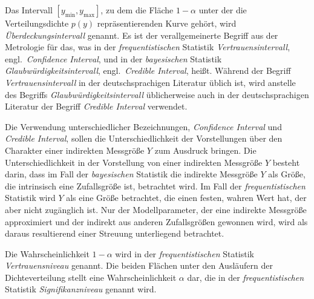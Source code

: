 Das Intervall $[y_\mathrm{min}, y_\mathrm{max}]$, zu dem die Fläche $1 - \alpha$ unter der die
Verteilungsdichte $p(y)$ repräsentierenden Kurve gehört, wird \textsl{Überdeckungsintervall} genannt.
Es ist der verallgemeinerte Begriff aus der Metrologie für das, was in der
\textsl{frequentistischen} Statistik \textsl{Vertrauensintervall},
engl.\  \textsl{Confidence Interval}, und in der \textsl{bayesischen} Statistik
\textsl{Glaubwürdigkeitsintervall}, engl.\ \textsl{Credible Interval},
heißt. Während der Begriff \textsl{Vertrauensintervall} in der deutschsprachigen
Literatur üblich ist, wird anstelle des Begriffs \textsl{Glaubwürdigkeitsintervall} üblicherweise
auch in der deutschsprachigen Literatur der Begriff \textsl{Credible Interval} verwendet.

Die Verwendung unterschiedlicher Bezeichnungen, \textsl{Confidence Interval} und
\textsl{Credible Interval}, sollen die Unterschiedlichkeit der Vorstellungen
über den Charakter einer indirekten Messgröße $Y$ zum Ausdruck bringen.
Die Unterschiedlichkeit in der Vorstellung von einer indirekten Messgröße $Y$ besteht darin,
dass im Fall der \textsl{bayesischen} Statistik
die indirekte Messgröße $Y$ als Größe, die intrinsisch eine Zufallsgröße ist, betrachtet
wird. Im Fall der \textsl{frequentistischen} Statistik wird $Y$ als eine Größe betrachtet,
die einen festen, wahren Wert hat, der aber nicht zugänglich ist. Nur der
Modellparameter, der eine indirekte Messgröße approximiert und der indirekt aus anderen
Zufallsgrößen gewonnen wird, wird als daraus resultierend einer Streuung unterliegend betrachtet.

Die Wahrscheinlichkeit $1 - \alpha$ wird in der \textsl{frequentistischen} Statistik
\textsl{Vertrauensniveau} genannt. Die beiden Flächen unter den
Ausläufern der Dichteverteilung stellt eine Wahrscheinlichkeit $\alpha$ dar, die in der
\textsl{frequentistischen} Statistik \textsl{Signifikanzniveau} genannt wird.

